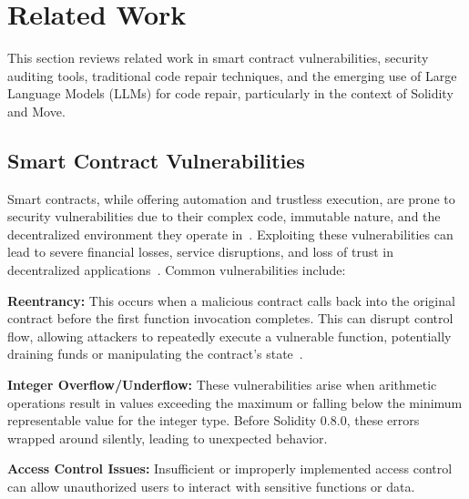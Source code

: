 \section{Related Work}

This section reviews related work in smart contract vulnerabilities, security auditing tools, traditional code repair techniques, and the emerging use of Large Language Models (LLMs) for code repair, particularly in the context of Solidity and Move.

\subsection{Smart Contract Vulnerabilities}

Smart contracts, while offering automation and trustless execution, are prone to security vulnerabilities due to their complex code, immutable nature, and the decentralized environment they operate in~\cite{sharma2023mixed,de2024vulnerability,2025arXiv250104600B}. Exploiting these vulnerabilities can lead to severe financial losses, service disruptions, and loss of trust in decentralized applications~\cite{q50t-pw43-24}. Common vulnerabilities include:

\textbf{Reentrancy:} This occurs when a malicious contract calls back into the original contract before the first function invocation completes\cite{so2023smartfix,tang2023deep}. This can disrupt control flow, allowing attackers to repeatedly execute a vulnerable function, potentially draining funds or manipulating the contract's state~\cite{tang2023deep,deng2023smart}. 


\textbf{Integer Overflow/Underflow:} These vulnerabilities arise when arithmetic operations result in values exceeding the maximum or falling below the minimum representable value for the integer type. Before Solidity 0.8.0, these errors wrapped around silently, leading to unexpected behavior. 

\textbf{Access Control Issues:} Insufficient or improperly implemented access control can allow unauthorized users to interact with sensitive functions or data. 

